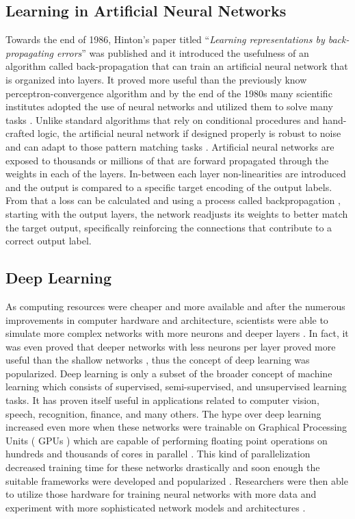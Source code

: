 \subsection{Learning in Artificial Neural Networks}
Towards the end of 1986, Hinton’s paper titled “\textit{Learning representations by back-propagating errors}”\cite{rumelhart1986learning} was published and it introduced the usefulness of an algorithm called back-propagation that can train an artificial neural network that is organized into layers. It proved more useful than the previously know perceptron-convergence algorithm \cite{widrow199030} and by the end of the 1980s many scientific institutes adopted the use of neural networks and utilized them to solve many tasks \cite{pao1989adaptive}. Unlike standard algorithms that rely on conditional procedures and hand-crafted logic, the artificial neural network if designed properly is robust to noise and can adapt to those pattern matching tasks \cite{wang1994robustness}. Artificial neural networks are exposed to thousands or millions of that are forward propagated through the weights in each of the layers. In-between each layer non-linearities are introduced and the output is compared to a specific target encoding of the output labels. From that a loss can be calculated and using a process called backpropagation \cite{rumelhart1986learning}, starting with the output layers, the network readjusts its weights to better match the target output, specifically reinforcing the connections that contribute to a correct output label.

\subsection{Deep Learning}
As computing resources were cheaper and more available and after the numerous improvements in computer hardware and architecture, scientists were able to simulate more complex networks with more neurons and deeper layers \cite{resnet}. In fact, it was even proved that deeper networks with less neurons per layer proved more useful than the shallow networks \cite{szegedy2015going}, thus the concept of deep learning was popularized. Deep learning is only a subset of the broader concept of machine learning which consists of supervised, semi-supervised, and unsupervised learning tasks. It has proven itself useful in applications related to computer vision, speech, recognition, finance, and many others. The hype over deep learning increased even more when these networks were trainable on Graphical Processing Units ( GPUs ) which are capable of performing floating point operations on hundreds and thousands of cores in parallel \cite{raina2009large}. This kind of parallelization decreased training time for these networks drastically and soon enough the suitable frameworks were developed and popularized \cite{tensorflow, theano}. Researchers were then able to utilize those hardware for training neural networks with more data and experiment with more sophisticated network models and architectures \cite{densenet, raina2009large,resnet}. 

